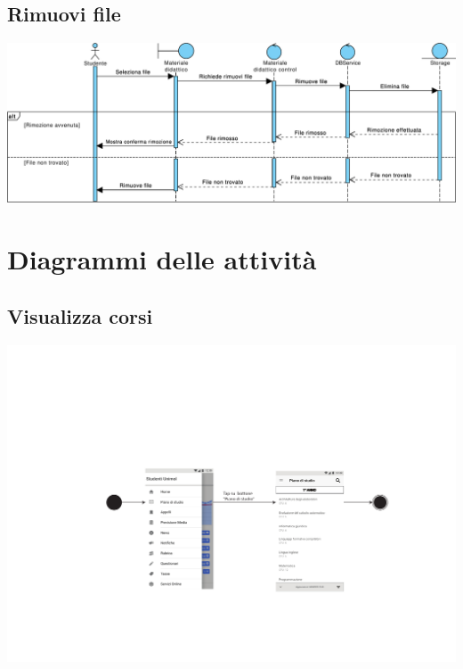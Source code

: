 \subsection{Rimuovi  file}
\begin{center}
	\includegraphics[width=6.5in]{imgs/gruppo1/sequence_diagrams/SD17_rimuovi_file.pdf}
\end{center}
\newpage




\section{Diagrammi delle attività}

\subsection{Visualizza corsi}
\begin{center}
	\includegraphics[width=6in]{imgs/gruppo1/activity_diagrams/AD1_Visualizza_corsi.pdf}
\end{center}
\newpage


